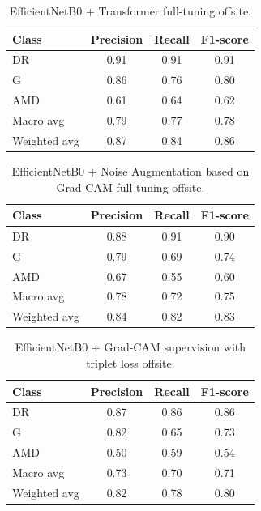 \documentclass{article}
\begin{document}
\begin{table}[t]
\centering
\begin{tabular}{lccc}
\toprule
\textbf{Class} & \textbf{Precision} & \textbf{Recall} & \textbf{F1-score} \\
\midrule
DR  & 0.91 & 0.91 & 0.91 \\
G   & 0.86 & 0.76 & 0.80 \\
AMD & 0.61 & 0.64 & 0.62 \\
\midrule
Macro avg    & 0.79 & 0.77 & 0.78 \\
Weighted avg & 0.87 & 0.84 & 0.86 \\
\bottomrule
\end{tabular}
\caption{EfficientNetB0 + Transformer full-tuning offsite.}
\label{tab:efficient_full_mha_task3}
\end{table}

\begin{table}[H]
\centering
\begin{tabular}{lccc}
\toprule
\textbf{Class} & \textbf{Precision} & \textbf{Recall} & \textbf{F1-score} \\
\midrule
DR  & 0.88 & 0.91 & 0.90 \\
G   & 0.79 & 0.69 & 0.74 \\
AMD & 0.67 & 0.55 & 0.60 \\
\midrule
Macro avg    & 0.78 & 0.72 & 0.75 \\
Weighted avg & 0.84 & 0.82 & 0.83 \\
\bottomrule
\end{tabular}
\caption{EfficientNetB0 + Noise Augmentation based on Grad-CAM full-tuning offsite.}
\label{tab:efficient_full_gradcam_task3}
\end{table}

\begin{table}[H]
\centering
\begin{tabular}{lccc}
\toprule
\textbf{Class} & \textbf{Precision} & \textbf{Recall} & \textbf{F1-score} \\
\midrule
DR  & 0.87 & 0.86 & 0.86 \\
G   & 0.82 & 0.65 & 0.73 \\
AMD & 0.50 & 0.59 & 0.54 \\
\midrule
Macro avg    & 0.73 & 0.70 & 0.71 \\
Weighted avg & 0.82 & 0.78 & 0.80 \\
\bottomrule
\end{tabular}
\caption{EfficientNetB0 + Grad-CAM supervision with triplet loss offsite.}
\label{tab:efficient_gradcam_task3}
\end{table}
\end{document}
